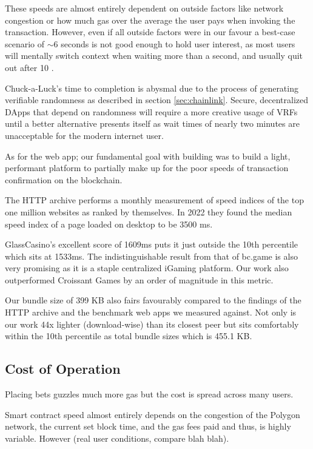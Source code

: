 \documentclass[10pt,journal,compsoc]{IEEEtran}
\begin{document}
These speeds are almost entirely dependent on outside factors like network congestion or how much gas over the average the user pays when invoking the transaction. However, even if all outside factors were in our favour a best-case scenario of $\sim$6 seconds is not good enough to hold user interest, as most users will mentally switch context when waiting more than a second, and usually quit out after 10 \cite{schofield2016meaningfully}.

Chuck-a-Luck's time to completion is abysmal due to the process of generating verifiable randomness as described in section \ref{sec:chainlink}. Secure, decentralized DApps that depend on randomness will require a more creative usage of VRFs until a better alternative presents itself as wait times of nearly two minutes are unacceptable for the modern internet user.

As for the web app; our fundamental goal with building was to build a light, performant platform to partially make up for the poor speeds of transaction confirmation on the blockchain.

The HTTP archive \cite{loading_speed_http_archive} performs a monthly measurement of speed indices of the top one million websites as ranked by themselves. In 2022 they found the median speed index of a page loaded on desktop to be 3500 ms.

GlassCasino's excellent score of 1609ms puts it just outside the 10th percentile which sits at 1533ms. The indistinguishable result from that of bc.game is also very promising as it is a staple centralized iGaming platform. Our work also outperformed Croissant Games by an order of magnitude in this metric.

Our bundle size of 399 KB also fairs favourably compared to the findings of the HTTP archive and the benchmark web apps we measured against. Not only is our work 44x lighter (download-wise) than its closest peer but sits comfortably within the 10th percentile as total bundle sizes which is 455.1 KB. 

\subsection{Cost of Operation}
Placing bets guzzles much more gas but the cost is spread across many users.

Smart contract speed almost entirely depends on the congestion of the Polygon network, the current set block time, and the gas fees paid and thus, is highly variable. However (real user conditions, compare blah blah).
\end{document}
